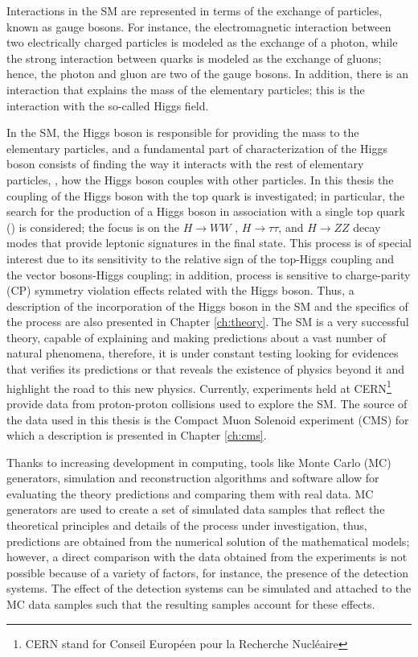 Interactions in the SM are represented in terms of the exchange of particles, known as gauge bosons. For instance, the electromagnetic interaction between two electrically charged particles is modeled as the exchange of a photon, while the strong interaction between quarks is modeled as the exchange of gluons; hence, the photon and gluon are two of the gauge bosons. In addition, there is an interaction that explains the mass of the elementary particles; this is the interaction with the so-called Higgs field.    

In the SM, the Higgs boson is responsible for providing the mass to the elementary particles, and a fundamental part of characterization of the Higgs boson consists of finding the way it interacts with the rest of elementary particles, \ie, how the Higgs boson couples with other particles. In this thesis the coupling of the Higgs boson with the top quark is investigated; in particular, the search for the production of a Higgs boson in association with a single top quark (\tH) is considered; the focus is on the $H \to WW$ , $H \to \tau\tau$, and $H \to ZZ$ decay modes that provide leptonic signatures in the final state. This process is of special interest due to its sensitivity to the relative sign of the top-Higgs coupling and the vector bosons-Higgs coupling; in addition, \tH process is sensitive to charge-parity (CP) symmetry violation effects related with the Higgs boson. Thus, a description of the incorporation of the Higgs boson in the SM and the specifics of the \tH process are also presented in Chapter \ref{ch:theory}.               
The SM is a very successful theory, capable of explaining and making predictions about a vast number of natural phenomena, therefore, it is under constant testing looking for evidences that verifies its predictions or that reveals the existence of physics beyond it and highlight the road to this new physics. Currently, experiments held at CERN\footnote{CERN stand for Conseil Europ\'een pour la Recherche Nucl\'eaire} provide data from proton-proton collisions used to explore the SM. The source of the data used in this thesis is the Compact Muon Solenoid experiment (CMS) for which a description is presented in Chapter \ref{ch:cms}.

Thanks to increasing development in computing, tools like Monte Carlo (MC) generators, simulation and reconstruction algorithms and software allow for evaluating the theory predictions and comparing them with real data. MC generators are used to create a set of simulated data samples that reflect the theoretical principles and details of the process under investigation, thus, predictions are obtained from the numerical solution of the mathematical models; however, a direct comparison with the data obtained from the experiments is not possible because of a variety of factors, for instance, the presence of the detection systems. The effect of the detection systems can be simulated and attached to the MC data samples such that the resulting samples account for these effects.

